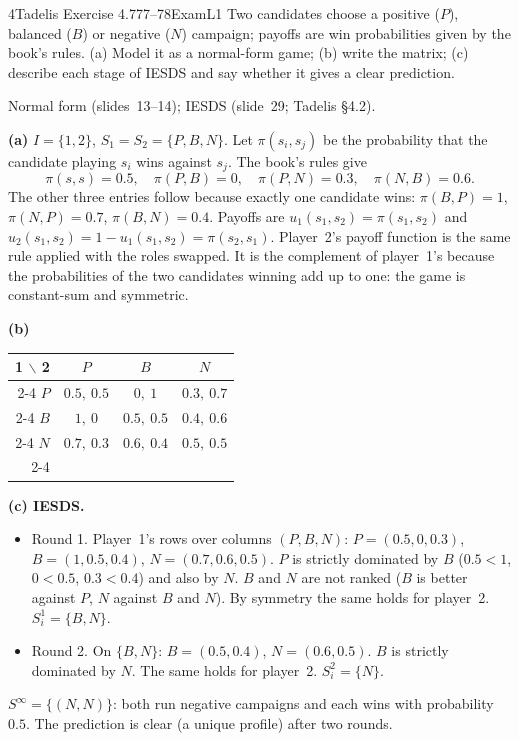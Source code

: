 \begin{exsol}{4}{Tadelis Exercise 4.7}{77--78}{Exam}{L1}
\asked Two candidates choose a positive ($P$), balanced ($B$) or negative ($N$) campaign; payoffs
are win probabilities given by the book's rules. (a) Model it as a normal-form game; (b) write
the matrix; (c) describe each stage of IESDS and say whether it gives a clear prediction.

\method Normal form (slides~13--14); IESDS (slide~29; Tadelis \S4.2).

\solution
\textbf{(a)} $I = \{1, 2\}$, $S_1 = S_2 = \{P, B, N\}$. Let $\pi(s_i, s_j)$ be the probability that
the candidate playing $s_i$ wins against $s_j$. The book's rules give
\[
  \pi(s,s) = 0.5,\quad \pi(P,B) = 0,\quad \pi(P,N) = 0.3,\quad \pi(N,B) = 0.6 .
\]
The other three entries follow because exactly one candidate wins:
$\pi(B,P) = 1$, $\pi(N,P) = 0.7$, $\pi(B,N) = 0.4$. Payoffs are $u_1(s_1,s_2) = \pi(s_1,s_2)$ and
$u_2(s_1,s_2) = 1 - u_1(s_1,s_2) = \pi(s_2,s_1)$. Player~2's payoff function is the same rule
applied with the roles swapped. It is the complement of player~1's because the probabilities of
the two candidates winning add up to one: the game is constant-sum and symmetric.

\textbf{(b)}
\begin{center}
\begin{tabular}{r|c|c|c|}
\multicolumn{1}{r}{1 $\backslash$ 2} & \multicolumn{1}{c}{$P$} & \multicolumn{1}{c}{$B$} & \multicolumn{1}{c}{$N$}\\ \cline{2-4}
$P$ & $0.5,\ 0.5$ & $0,\ 1$ & $0.3,\ 0.7$ \\ \cline{2-4}
$B$ & $1,\ 0$ & $0.5,\ 0.5$ & $0.4,\ 0.6$ \\ \cline{2-4}
$N$ & $0.7,\ 0.3$ & $0.6,\ 0.4$ & $0.5,\ 0.5$ \\ \cline{2-4}
\end{tabular}
\end{center}

\textbf{(c) IESDS.}
\begin{itemize}
  \item Round 1. Player~1's rows over columns $(P, B, N)$: $P = (0.5, 0, 0.3)$,
  $B = (1, 0.5, 0.4)$, $N = (0.7, 0.6, 0.5)$. $P$ is strictly dominated by $B$
  ($0.5 < 1$, $0 < 0.5$, $0.3 < 0.4$) and also by $N$. $B$ and $N$ are not ranked ($B$ is better
  against $P$, $N$ against $B$ and $N$). By symmetry the same holds for player~2.
  $S_i^1 = \{B, N\}$.
  \item Round 2. On $\{B, N\}$: $B = (0.5, 0.4)$, $N = (0.6, 0.5)$. $B$ is strictly dominated
  by $N$. The same holds for player~2. $S_i^2 = \{N\}$.
\end{itemize}
$S^\infty = \{(N, N)\}$: both run negative campaigns and each wins with probability $0.5$. The
prediction is clear (a unique profile) after two rounds.


\end{exsol}
